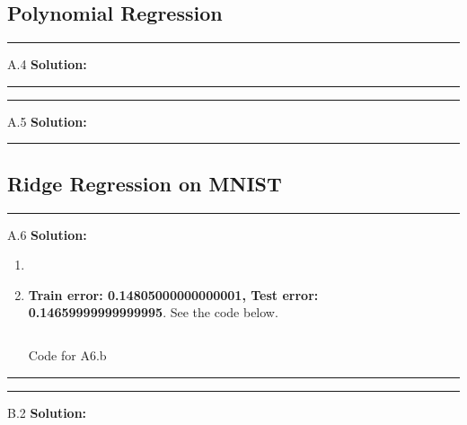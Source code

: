 \documentclass{article}
\newcommand{\1}{\mathbf{1}}
\begin{document}
\subsection*{Polynomial Regression}

\noindent\rule{\textwidth}{1pt}
A.4 {\bf Solution:}\\
\noindent\rule{\textwidth}{1pt}
    
\noindent\rule{\textwidth}{1pt}
A.5 {\bf Solution:}\\

\noindent\rule{\textwidth}{1pt}

\subsection*{Ridge Regression on MNIST}
\noindent\rule{\textwidth}{1pt}
A.6 {\bf Solution:}\\
\begin{enumerate}
    \item 
    \item {\bf Train error: 0.14805000000000001, Test error: 0.14659999999999995}. See the code below. 
          \inputminted{python}{code/A6_b.py}
          \caption{Code for A6.b}
          \label{listing:a6.b}
\end{enumerate}
\noindent\rule{\textwidth}{1pt}
\noindent\rule{\textwidth}{1pt}
B.2 {\bf Solution:}\\
\end{document}
